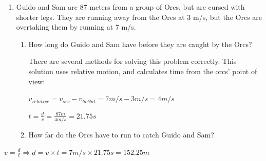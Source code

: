 \documentclass[letterpaper, 12pt]{article}
\begin{document}
\begin{enumerate}
\item Guido and Sam are 87 meters from a group of Orcs, but are cursed with shorter legs. They are running away from the Orcs at 3 m/s, but the Orcs are overtaking them by running at 7 m/s.  
\begin{enumerate}
\item How long do Guido and Sam have before they are caught by the Orcs?\color{red} 

There are several methods for solving this problem correctly.  This solution uses relative motion, and calculates time from the orcs' point of view: $ $
	 \begin{center}
	$ v_{relative} = v_{orc} - v_{hobbit} = 7 m/s - 3 m/s = 4 m/s $
	
\vspace{.05in}
	$t = \frac{d}{v} = \frac{87m}{4 m/s} = 21.75 s$
	
\end{center}



\color{black}

\item How far do the Orcs have to run to catch Guido and Sam?
\end{enumerate}


	
\end{enumerate}
 \color{red}
	 \begin{center}
$	v = \frac{d}{t} \Longrightarrow d = v \times t = 7 m/s \times 21.75 s = 152.25 m $

	
\end{center}



\color{black}
\end{document}
